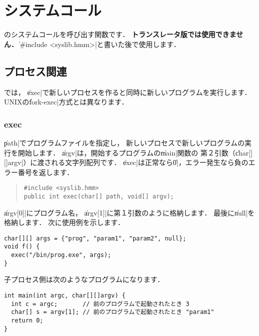 %
%
\chapter{システムコール}

\tacos のシステムコールを呼び出す関数です．
{\bf トランスレータ版では使用できません．}
\|#include <syslib.hmm>|と書いた後で使用します．

\section{プロセス関連}

\tacos では，
\|exec|で新しいプロセスを作ると同時に新しいプログラムを実行します．
UNIXの\|fork-exec|方式とは異なります．


\subsection{exec}

\|path|でプログラムファイルを指定し，
新しいプロセスで新しいプログラムの実行を開始します．
\|argv|は，開始するプログラムの\|main|関数の
第２引数（\|char[][]argv|）に渡される文字列配列です．
\|exec|は正常なら\|0|，エラー発生なら負のエラー番号を返します．

\begin{quote}
\begin{verbatim}
#include <syslib.hmm>
public int exec(char[] path, void[] argv);
\end{verbatim}
\end{quote}

\|argv[0]|にプログラム名，
\|argv[1]|に第１引数のように格納します．
最後に\|null|を格納します．
次に使用例を示します．

\begin{mylist}
\begin{verbatim}
char[][] args = {"prog", "param1", "param2", null};
void f() {
  exec("/bin/prog.exe", args);
}
\end{verbatim}
\end{mylist}

子プロセス側は次のようなプログラムになります．

\begin{mylist}
\begin{verbatim}
int main(int argc, char[][]argv) {
  int c = argc;       // 前のプログラムで起動されたとき 3
  char[] s = argv[1]; // 前のプログラムで起動されたとき "param1"
  return 0;
}
\end{verbatim}
\end{mylist}

